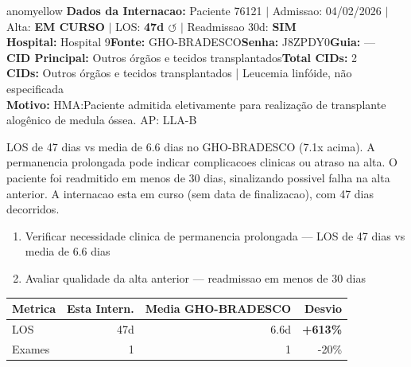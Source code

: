 \documentclass[a4paper,10pt]{article}
\begin{document}
\begin{anomalycard}[Internacao 116895 | GHO-BRADESCO | MODERADO (z=2.30)]{anomyellow}
\textbf{Dados da Internacao:} Paciente 76121 $\mid$ Admissao: 04/02/2026 $\mid$ Alta: \textcolor{anomorange}{\textbf{EM CURSO}} $\mid$ LOS: \textbf{47d \textcolor{anomorange}{$\circlearrowleft$}} $\mid$ Readmissao 30d: \textcolor{anomred}{\textbf{SIM}}\\
\textbf{Hospital:} Hospital 9\quad\textbf{Fonte:} GHO-BRADESCO\quad\textbf{Senha:} J8ZPDY0\quad\textbf{Guia:} ---\\
\textbf{CID Principal:} {\small Outros órgãos e tecidos transplantados}\quad\textbf{Total CIDs:} 2\\

\textbf{CIDs:} {\scriptsize Outros órgãos e tecidos transplantados | Leucemia linfóide, não especificada}\\

\textbf{Motivo:} {\scriptsize HMA:Paciente admitida eletivamente para realização de transplante alogênico de medula óssea.  AP: LLA-B}\\

\vspace{2pt}\begin{tcolorbox}[colback=severityred!20,colframe=anomyellow,title={\textbf{Interpretacao de Negocio}},fonttitle=\bfseries\small,left=4pt,right=4pt,top=3pt,bottom=3pt]
{\small LOS de 47 dias vs media de 6.6 dias no GHO-BRADESCO (7.1x acima). A permanencia prolongada pode indicar complicacoes clinicas ou atraso na alta. O paciente foi readmitido em menos de 30 dias, sinalizando possivel falha na alta anterior. A internacao esta em curso (sem data de finalizacao), com 47 dias decorridos.}
\end{tcolorbox}
\begin{tcolorbox}[colback=severityyellow!30,colframe=anomorange,title={\textbf{Recomendacoes Especificas}},fonttitle=\bfseries\small,left=4pt,right=4pt,top=3pt,bottom=3pt]
\begin{enumerate}[nosep,leftmargin=16pt]
\item {\small Verificar necessidade clinica de permanencia prolongada --- LOS de 47 dias vs media de 6.6 dias}
\item {\small Avaliar qualidade da alta anterior --- readmissao em menos de 30 dias}
\end{enumerate}
\end{tcolorbox}
\begin{center}\begin{tabular}{l r r r}\toprule\textbf{Metrica} & \textbf{Esta Intern.} & \textbf{Media GHO-BRADESCO} & \textbf{Desvio} \\\midrule
LOS & 47d & 6.6d & \textcolor{anomred}{\textbf{+613\%}} \\
Exames & 1 & 1 & -20\% \\
\bottomrule\end{tabular}\end{center}


\end{anomalycard}
\end{document}
